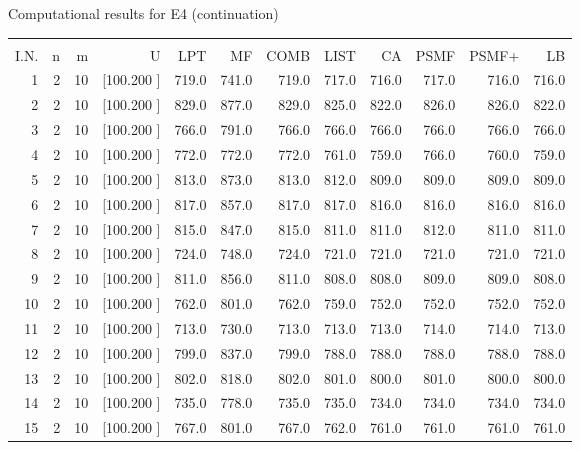 \documentclass[12pt,a4paper]{article}
\begin{document}
\newpage
\begin{center}
 Computational results for E4 (continuation) {\tiny
\begin{tabular}{r r r r r r r r r r r r}\hline
    &   &   &          &        &        &        &        &        &        &        &       \\[-0.1in]
  I.N.  &  n  &  m  &  U  &  LPT  &  MF  &  COMB  &  LIST  &  CA  & PSMF &PSMF+ & LB \\[0.03in]
\hline
   1&  2& 10&[100.200   ]&   719.0&   741.0&   719.0&   717.0&   716.0&   717.0&   716.0&   716.0\\[-0.02in]
   2&  2& 10&[100.200   ]&   829.0&   877.0&   829.0&   825.0&   822.0&   826.0&   826.0&   822.0\\[-0.02in]
   3&  2& 10&[100.200   ]&   766.0&   791.0&   766.0&   766.0&   766.0&   766.0&   766.0&   766.0\\[-0.02in]
   4&  2& 10&[100.200   ]&   772.0&   772.0&   772.0&   761.0&   759.0&   766.0&   760.0&   759.0\\[-0.02in]
   5&  2& 10&[100.200   ]&   813.0&   873.0&   813.0&   812.0&   809.0&   809.0&   809.0&   809.0\\[-0.02in]
   6&  2& 10&[100.200   ]&   817.0&   857.0&   817.0&   817.0&   816.0&   816.0&   816.0&   816.0\\[-0.02in]
   7&  2& 10&[100.200   ]&   815.0&   847.0&   815.0&   811.0&   811.0&   812.0&   811.0&   811.0\\[-0.02in]
   8&  2& 10&[100.200   ]&   724.0&   748.0&   724.0&   721.0&   721.0&   721.0&   721.0&   721.0\\[-0.02in]
   9&  2& 10&[100.200   ]&   811.0&   856.0&   811.0&   808.0&   808.0&   809.0&   809.0&   808.0\\[-0.02in]
  10&  2& 10&[100.200   ]&   762.0&   801.0&   762.0&   759.0&   752.0&   752.0&   752.0&   752.0\\[-0.02in]
  11&  2& 10&[100.200   ]&   713.0&   730.0&   713.0&   713.0&   713.0&   714.0&   714.0&   713.0\\[-0.02in]
  12&  2& 10&[100.200   ]&   799.0&   837.0&   799.0&   788.0&   788.0&   788.0&   788.0&   788.0\\[-0.02in]
  13&  2& 10&[100.200   ]&   802.0&   818.0&   802.0&   801.0&   800.0&   801.0&   800.0&   800.0\\[-0.02in]
  14&  2& 10&[100.200   ]&   735.0&   778.0&   735.0&   735.0&   734.0&   734.0&   734.0&   734.0\\[-0.02in]
  15&  2& 10&[100.200   ]&   767.0&   801.0&   767.0&   762.0&   761.0&   761.0&   761.0&   761.0\\[-0.02in]

\end{tabular}}
\end{center}
\end{document}

